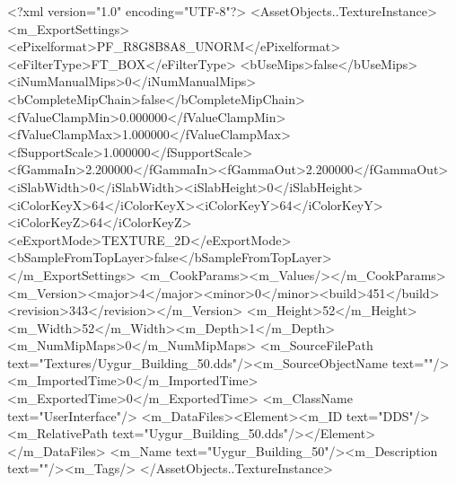<?xml version="1.0" encoding="UTF-8"?>
<AssetObjects..TextureInstance>
  <m_ExportSettings>
    <ePixelformat>PF_R8G8B8A8_UNORM</ePixelformat><eFilterType>FT_BOX</eFilterType>
    <bUseMips>false</bUseMips><iNumManualMips>0</iNumManualMips><bCompleteMipChain>false</bCompleteMipChain>
    <fValueClampMin>0.000000</fValueClampMin><fValueClampMax>1.000000</fValueClampMax><fSupportScale>1.000000</fSupportScale>
    <fGammaIn>2.200000</fGammaIn><fGammaOut>2.200000</fGammaOut><iSlabWidth>0</iSlabWidth><iSlabHeight>0</iSlabHeight>
    <iColorKeyX>64</iColorKeyX><iColorKeyY>64</iColorKeyY><iColorKeyZ>64</iColorKeyZ>
    <eExportMode>TEXTURE_2D</eExportMode><bSampleFromTopLayer>false</bSampleFromTopLayer>
  </m_ExportSettings>
  <m_CookParams><m_Values/></m_CookParams>
  <m_Version><major>4</major><minor>0</minor><build>451</build><revision>343</revision></m_Version>
  <m_Height>52</m_Height><m_Width>52</m_Width><m_Depth>1</m_Depth><m_NumMipMaps>0</m_NumMipMaps>
  <m_SourceFilePath text="Textures/Uygur_Building_50.dds"/><m_SourceObjectName text=""/>
  <m_ImportedTime>0</m_ImportedTime><m_ExportedTime>0</m_ExportedTime>
  <m_ClassName text="UserInterface"/>
  <m_DataFiles><Element><m_ID text="DDS"/><m_RelativePath text="Uygur_Building_50.dds"/></Element></m_DataFiles>
  <m_Name text="Uygur_Building_50"/><m_Description text=""/><m_Tags/>
</AssetObjects..TextureInstance>
